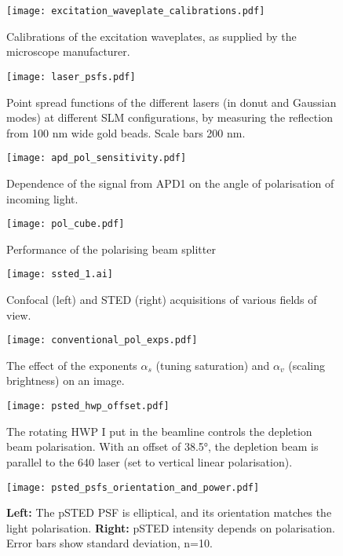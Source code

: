 \begin{figure}
	\centering
	\texttt{[image: excitation\_waveplate\_calibrations.pdf]}
	\caption{
		Calibrations of the excitation waveplates, as supplied by the microscope manufacturer.
	}
	\label{fig:excitation waveplate calibration}
\end{figure}

\begin{figure}
	\centering
	\texttt{[image: laser\_psfs.pdf]}
	\caption{
		Point spread functions of the different lasers (in donut and Gaussian modes) at different SLM configurations, by measuring the reflection from 100 nm wide gold beads. Scale bars 200 nm.
	}
	\label{fig:normal psfs}
\end{figure}

\begin{figure}
	\centering
	\texttt{[image: apd\_pol\_sensitivity.pdf]}
	\caption{Dependence of the signal from APD1 on the angle of polarisation of incoming light.}
	\label{fig:apd pol sensitivity}
\end{figure}

\begin{figure}
	\centering
	\texttt{[image: pol\_cube.pdf]}
	\caption{Performance of the polarising beam splitter}
	\label{fig:pol cube}
\end{figure}

\begin{figure}
	\centering
	\texttt{[image: ssted\_1.ai]}
	\caption{
		Confocal (left) and STED (right) acquisitions of various fields of view.
	}
	\label{fig:ssted supplementary}
\end{figure}


\begin{figure}
	\centering
	\texttt{[image: conventional\_pol\_exps.pdf]}
	\caption{
		The effect of the exponents $ \alpha_s $ (tuning saturation) and $ \alpha_v $ (scaling brightness) on an image.
	}
	\label{fig:power law exponents}
\end{figure}

\begin{figure}
	\centering
	\texttt{[image: psted\_hwp\_offset.pdf]}
	\caption{
		The rotating HWP I put in the beamline controls the depletion beam polarisation. With an offset of 38.5°, the depletion beam is parallel to the 640 laser (set to vertical linear polarisation).
	}
	\label{fig:psted hwp offset}
\end{figure}

\begin{figure}
	\centering
	\texttt{[image: psted\_psfs\_orientation\_and\_power.pdf]}
	\caption{
		\textbf{Left:} The pSTED PSF is elliptical, and its orientation matches the light polarisation. \textbf{Right:} pSTED intensity depends on polarisation. Error bars show standard deviation, n=10.
	}
	\label{fig:psted psf orientation and power}
\end{figure}

